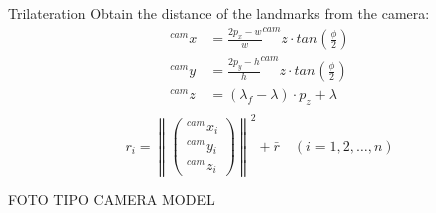 \documentclass[10pt]{beamer}
\newcommand\norm[1]{\left\lVert#1\right\rVert}
\begin{document}
    \begin{frame}[fragile]{Trilateration}
        Obtain the distance of the landmarks from the camera:
        \begin{align*}
            ^{cam}{x}{} &= \frac{2 p_x - w}{w} ^{cam}{z}{} \cdot tan\left(\frac{\phi}{2}\right) \\
            ^{cam}{y}{} &= \frac{2 p_y - h}{h} ^{cam}{z}{} \cdot tan\left(\frac{\phi}{2}\right) \\
            ^{cam}{z}{} &= (\lambda_f - \lambda) \cdot p_z + \lambda \\
        \end{align*}
        \begin{equation*}
            r_i =
            \norm{
                \begin{pmatrix}
                    ^{cam}{x}{_i} \\
                    ^{cam}{y}{_i} \\
                    ^{cam}{z}{_i}
                \end{pmatrix}
                }^2 + \bar{r} \quad (i = 1, 2, \dots, n)
        \end{equation*}

        FOTO TIPO CAMERA MODEL
    \end{frame}
\end{document}
